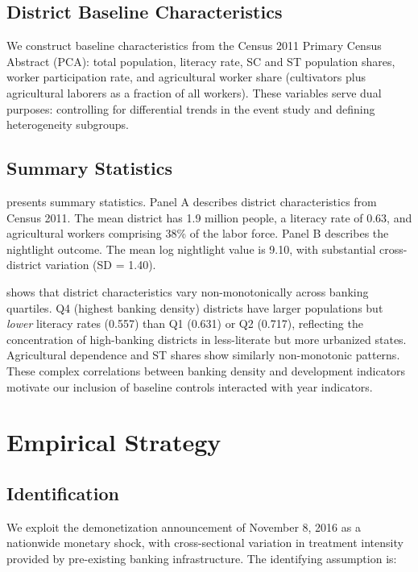 \documentclass[12pt]{article}
\begin{document}
\subsection{District Baseline Characteristics}

We construct baseline characteristics from the Census 2011 Primary Census Abstract (PCA): total population, literacy rate, SC and ST population shares, worker participation rate, and agricultural worker share (cultivators plus agricultural laborers as a fraction of all workers). These variables serve dual purposes: controlling for differential trends in the event study and defining heterogeneity subgroups.

\subsection{Summary Statistics}

 presents summary statistics. Panel A describes district characteristics from Census 2011. The mean district has 1.9 million people, a literacy rate of 0.63, and agricultural workers comprising 38\% of the labor force. Panel B describes the nightlight outcome. The mean log nightlight value is 9.10, with substantial cross-district variation (SD = 1.40).



 shows that district characteristics vary non-monotonically across banking quartiles. Q4 (highest banking density) districts have larger populations but \textit{lower} literacy rates (0.557) than Q1 (0.631) or Q2 (0.717), reflecting the concentration of high-banking districts in less-literate but more urbanized states. Agricultural dependence and ST shares show similarly non-monotonic patterns. These complex correlations between banking density and development indicators motivate our inclusion of baseline controls interacted with year indicators.




\section{Empirical Strategy}\label{sec:strategy}

\subsection{Identification}

We exploit the demonetization announcement of November 8, 2016 as a nationwide monetary shock, with cross-sectional variation in treatment intensity provided by pre-existing banking infrastructure. The identifying assumption is:
\end{document}
